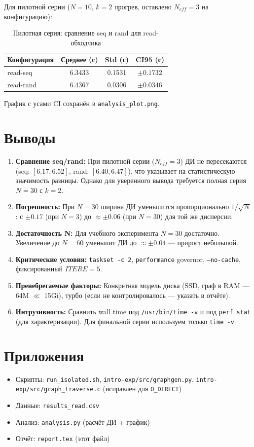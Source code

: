 \documentclass[12pt,a4paper]{article}
\begin{document}
Для пилотной серии ($N=10$, $k=2$ прогрев, оставлено $N_{eff}=3$ на конфигурацию):
\begin{table}[h]
\centering
\begin{tabular}{lccc}
\toprule
Конфигурация & Среднее (с) & Std (с) & CI95 (с) \\
\midrule
read-seq & 6.3433 & 0.1531 & $\pm 0.1732$ \\
read-rand & 6.4367 & 0.0306 & $\pm 0.0346$ \\
\bottomrule
\end{tabular}
\caption{Пилотная серия: сравнение seq и rand для read-обходчика}
\end{table}

График с усами CI сохранён в \texttt{analysis\_plot.png}.

\section{Выводы}
\begin{enumerate}
    \item \textbf{Сравнение seq/rand:} При пилотной серии ($N_{eff}=3$) ДИ не пересекаются (seq: $[6.17, 6.52]$, rand: $[6.40, 6.47]$), что указывает на статистическую значимость разницы. Однако для уверенного вывода требуется полная серия $N=30$ с $k=2$.
    \item \textbf{Погрешность:} При $N=30$ ширина ДИ уменьшится пропорционально $1/\sqrt{N}$: с $\pm 0.17$ (при $N=3$) до $\approx \pm 0.06$ (при $N=30$) для той же дисперсии.
    \item \textbf{Достаточность N:} Для учебного эксперимента $N=30$ достаточно. Увеличение до $N=60$ уменьшит ДИ до $\approx \pm 0.04$ — прирост небольшой.
    \item \textbf{Критические условия:} \texttt{taskset -c 2}, \texttt{performance} governor, \texttt{--no-cache}, фиксированный $ITERE=5$.
    \item \textbf{Пренебрегаемые факторы:} Конкретная модель диска (SSD, граф в RAM — 64M $\ll$ 15Gi), турбо (если не контролировалось — указать в отчёте).
    \item \textbf{Интрузивность:} Сравнить wall time под \texttt{/usr/bin/time -v} и под \texttt{perf stat} (для характеризации). Для финальной серии используем только \texttt{time -v}.
\end{enumerate}

\section{Приложения}
\begin{itemize}
    \item Скрипты: \texttt{run\_isolated.sh}, \texttt{intro-exp/src/graphgen.py}, \texttt{intro-exp/src/graph\_traverse.c} (исправлен для \texttt{O\_DIRECT})
    \item Данные: \texttt{results\_read.csv}
    \item Анализ: \texttt{analysis.py} (расчёт ДИ + график)
    \item Отчёт: \texttt{report.tex} (этот файл)
\end{itemize}
\end{document}
